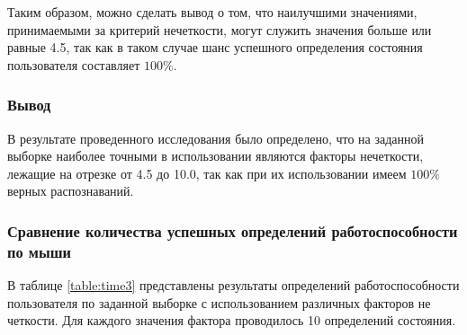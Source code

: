 Таким образом, можно сделать вывод о том, что наилучшими значениями, принимаемыми за критерий нечеткости, могут служить значения больше или равные 4.5, так как в таком случае шанс успешного определения состояния пользователя составляет $100\%$.

\subsubsection*{Вывод}

В результате проведенного исследования было определено, что на заданной выборке наиболее точными в использовании являются факторы нечеткости, лежащие на отрезке от 4.5 до 10.0, так как при их использовании имеем $100\%$ верных распознаваний.

\subsubsection[Сравнение количества успешных определений работоспособности по \newline мыши]{Сравнение количества успешных определений работоспособности по мыши}

В таблице \ref{table:time3} представлены результаты определений работоспособности пользователя по заданной выборке с использованием различных факторов не \- четкости. Для каждого значения фактора проводилось 10 определений состояния.

